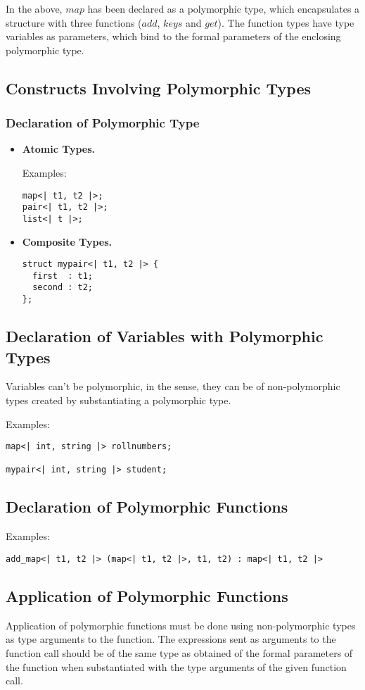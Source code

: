 \documentclass[12pt,a4paper]{report}
\begin{document}
In the above, $map$ has been declared as a polymorphic type, which encapsulates a structure with three functions ($add$, $keys$ and $get$). The function types have type variables as parameters, which bind to the formal parameters of the enclosing polymorphic type.

\subsection{Constructs Involving Polymorphic Types}
\subsubsection{Declaration of Polymorphic Type}
\begin{itemize}
\item \textbf{Atomic Types.}

Examples:
\begin{lstlisting}
map<| t1, t2 |>;
pair<| t1, t2 |>;
list<| t |>;
\end{lstlisting}
\item \textbf{Composite Types.}
\begin{lstlisting}
struct mypair<| t1, t2 |> {
  first  : t1;
  second : t2;
};
\end{lstlisting}

\end{itemize}

\subsection{Declaration of Variables with Polymorphic Types}
Variables can't be polymorphic, in the sense, they can be of non-polymorphic types created by substantiating a polymorphic type.

Examples:
\begin{lstlisting}
map<| int, string |> rollnumbers;

mypair<| int, string |> student;
\end{lstlisting}


\subsection{Declaration of Polymorphic Functions}
Examples:
\begin{lstlisting}
add_map<| t1, t2 |> (map<| t1, t2 |>, t1, t2) : map<| t1, t2 |>
\end{lstlisting}

\subsection{Application of Polymorphic Functions}
Application of polymorphic functions must be done using non-polymorphic types as type arguments to the function. The expressions sent as arguments to the function call should be of the same type as obtained of the formal parameters of the function when substantiated with the type arguments of the given function call.
\end{document}
